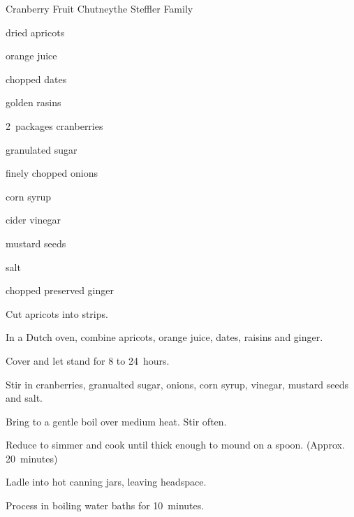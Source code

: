 \begin{recipe}{Cranberry Fruit Chutney}{the Steffler Family}{}

\begin{ingredients}
\item {} dried apricots
\item \C{2\half} orange juice
\item {} chopped dates
\item \C{\half} golden rasins
\item 2~packages cranberries
\item \C{1\half} granulated sugar
\item \C{1\quarter} finely chopped onions
\item \C{\threequarter} corn syrup
\item \C{\threequarter} cider vinegar
\item \tp{1\half} mustard seeds
\item \tp{\quarter} salt
\item \C{\half} chopped preserved ginger
\end{ingredients}

\begin{directions}
\item Cut apricots into \cm{\half} strips.
\item In a Dutch oven, combine apricots, orange juice, dates, raisins and ginger.
\item Cover and let stand for 8 to 24~hours.
\item Stir in cranberries, granualted sugar, onions, corn syrup, vinegar, mustard seeds and salt.
\item Bring to a gentle boil over medium heat. Stir often.
\item Reduce to simmer and cook until thick enough to mound on a spoon. (Approx. 20~minutes)
\item Ladle into  hot canning jars, leaving \cm{\half} headspace.
\item Process in boiling water baths for 10~minutes.
\end{directions}
\end{recipe}
